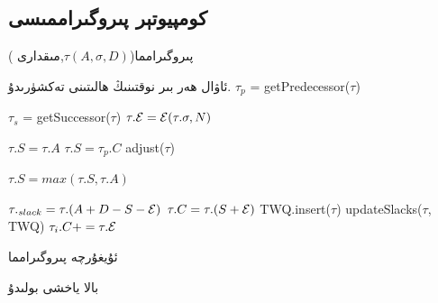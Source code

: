 \documentclass[24]{article}
\begin{document}
\setatomsep{2em}

\begin{Arabic}
\newfontfamily{}
\section{\textarabic{كومپيوتېر پىروگىراممىسى}}
\end{Arabic}
\begin{algorithm}
\caption{\textarabic{پىروگىرامما}($\tau(A,\sigma,D)$,\textarabic{مىقدارى} )}
\label{uyghur-alg}
\begin{algorithmic}[1]
\STATE \textarabic{ئاۋال ھەر بىر نوقتىنىڭ ھالىتىنى تەكشۈرىدۇ.}
  \ENDIF
\STATE $\tau_p$ = getPredecessor($\tau$)  \label{getPredecessor2}

\STATE $\tau_s$ = getSuccessor($\tau$) \label{getSuccessor2}
\STATE $\tau.{\cal E}=  {\cal E}(\tau.\sigma,N)$

\ENDIF


\STATE $\tau.S = \tau.A$
\ELSE
\STATE  $\tau.S = \tau_p.C$
\STATE adjust($\tau$)
\ENDIF

\STATE $\tau.S= max(\tau.S, \tau.A)$
\ENDIF


\ELSE
\STATE $\tau._{slack} = \tau.(A + D - S - {\cal E})$
\STATE $\tau.C = \tau.(S + {\cal E})$
\STATE TWQ.insert($\tau$)
\STATE updateSlacks($\tau$, TWQ)
\STATE $\tau_i.C +=\tau.{\cal E}$
\ENDFOR


\ENDIF

\end{algorithmic}
\end{algorithm}


\begin{algorithm}
\caption{\textarabic{ئۇيغۇرچە پىروگىرامما}}
\label{uyghur-alg}
\begin{algorithmic}
\STATE \textarabic{بالا ياخشى بولىدۇ}
\ENDIF
\ENDIF
\end{algorithmic}
\end{algorithm}
\end{document}
